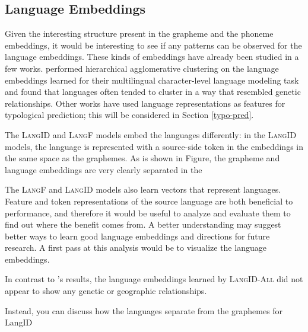 \subsection{Language Embeddings}
Given the interesting structure present in the grapheme and the phoneme embeddings, it would be interesting to see if any patterns can be observed for the language embeddings. These kinds of embeddings have already been studied in a few works. \cite{ostling2017continuous} performed hierarchical agglomerative clustering on the language embeddings learned for their multilingual character-level language modeling task and found that languages often tended to cluster in a way that resembled genetic relationships. Other works \citep{malaviya17emnlp,bjerva2017tracking} have used language representations as features for typological prediction; this will be considered in Section \ref{typo-pred}.

The \textsc{LangID} and \textsc{LangF} models embed the languages differently: in the \textsc{LangID} models, the language is represented with a source-side token in the embeddings in the same space as the graphemes. As is shown in Figure, the grapheme and language embeddings are very clearly separated in the 

The \textsc{LangF} and \textsc{LangID} models also learn vectors that represent languages. Feature and token representations of the source language are both beneficial to performance, and therefore it would be useful to analyze and evaluate them to find out where the benefit comes from. A better understanding may suggest better ways to learn good language embeddings and directions for future research. A first pass at this analysis would be to visualize the language embeddings.



In contrast to \citeauthor{ostling2017continuous}'s results, the language embeddings learned by \textsc{LangID-All} did not appear to show any genetic or geographic relationships.

Instead, you can discuss how the languages separate from the graphemes for LangID





